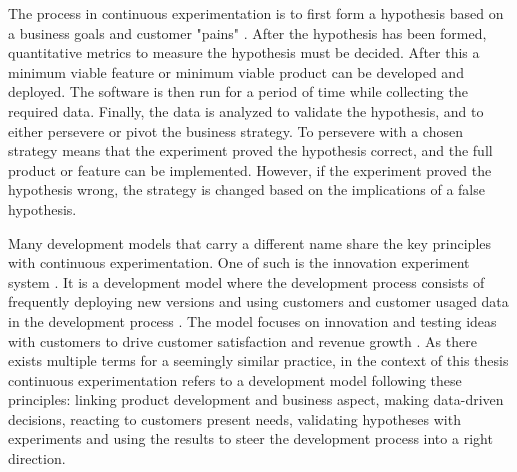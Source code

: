 \documentclass[english, grading]{tktltiki2}
\theoremstyle{definition}
\theoremstyle{remark}
\begin{document}
The process in continuous experimentation is to first form a hypothesis based on a business goals and customer "pains" \cite{bosch2012building}. After the hypothesis has been formed, quantitative metrics to measure the hypothesis must be decided. After this a minimum viable feature or minimum viable product can be developed and deployed. The software is then run for a period of time while collecting the required data. Finally, the data is analyzed to validate the hypothesis, and to either persevere or pivot the business strategy. To persevere with a chosen strategy means that the experiment proved the hypothesis correct, and the full product or feature can be implemented. However, if the experiment proved the hypothesis wrong, the strategy is changed based on the implications of a false hypothesis.

Many development models that carry a different name share the key principles with continuous experimentation. One of such is the innovation experiment system \cite{bosch2012building}. It is a development model where the development process consists of frequently deploying new versions and using customers and customer usaged data in the development process \cite{bosch2012building}. The model focuses on innovation and testing ideas with customers to drive customer satisfaction and revenue growth \cite{bosch2012building}. As there exists multiple terms for a seemingly similar practice, in the context of this thesis continuous experimentation refers to a development model following these principles: linking product development and business aspect, making data-driven decisions, reacting to customers present needs, validating hypotheses with experiments and using the results to steer the development process into a right direction.%
\end{document}
